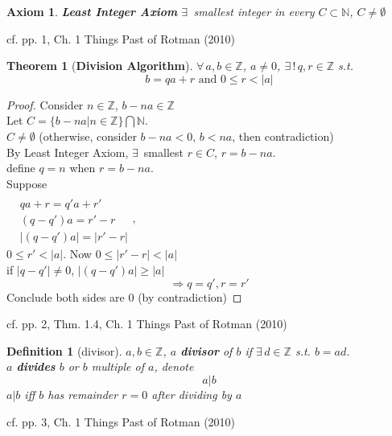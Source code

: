 \documentclass[10pt]{amsart}
\newtheorem{theorem}{Theorem}
\newtheorem{axiom}{Axiom}
\newtheorem{definition}{Definition}
\begin{document}
\begin{multicols*}{2}
\begin{axiom} \textbf{Least Integer Axiom}
	$\exists \, $ smallest integer in every $C \subset \mathbb{N}$, $C\neq \emptyset$
\end{axiom}
cf. pp. 1, Ch. 1 Things Past of Rotman (2010) \cite{JRotman2010}  


\begin{theorem}[\textbf{Division Algorithm}]\label{Thm:DivisionAlgorithm} 
	$\forall \, a , b \in \mathbb{Z}$, $a\neq 0$, $\exists \, ! \, q,r \in \mathbb{Z}$ s.t. 
	\[
	b = qa + r \text{ and } 0 \leq r < |a|
	\]
\end{theorem}


\begin{proof}
	Consider $n \in \mathbb{Z}$, $b-na \in \mathbb{Z}$ \\
	Let $C= \lbrace b - na | n \in \mathbb{Z} \rbrace \bigcap \mathbb{N}$.  \\
	\phantom{\quad} $C\neq \emptyset$ (otherwise, consider $b-na < 0$, $b<na$, then contradiction) \\
	By Least Integer Axiom, $\exists \, $ smallest $r\in C$, $r= b-na$.  \\
	\phantom{\quad } define $q=n$ when $r=b-na$.  \\
	Suppose \\
	$\begin{aligned}  & \quad \\ & qa + r = q'a + r' \\ & (q-q')a = r'-r \\ & |(q-q')a| = |r'-r| \end{aligned}$, \\

	$0\leq r' < |a|$.  Now $0\leq |r'-r | < |a|$ \\
	\phantom{\quad } if $|q-q'| \neq 0$, $|(q-q')a | \geq |a|$ 
	\[
	\Longrightarrow q=q', r=r'
	\]
	Conclude both sides are $0$ (by contradiction)
\end{proof}
cf. pp. 2, Thm. 1.4, Ch. 1 Things Past of Rotman (2010) \cite{JRotman2010}  

\begin{definition}[divisor]
	$a,b \in \mathbb{Z}$, $a$ \textbf{divisor} of $b$ if $\exists \, d \in \mathbb{Z}$ s.t. $b=ad$. \\
	$a$ \textbf{divides} $b$ or $b$ multiple of $a$, denote 
	\[
	a | b
	\]
	$a|b$ iff $b$ has remainder $r=0$ after dividing by $a$
\end{definition}
cf. pp. 3, Ch. 1 Things Past of Rotman (2010) \cite{JRotman2010}  



\end{multicols*}
\end{document}
